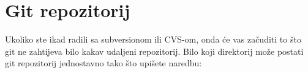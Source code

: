 \chapter*{Git repozitorij}

Ukoliko ste ikad radili sa subversionom ili CVS-om, onda će vas začuditi to što git ne zahtijeva bilo kakav udaljeni repozitorij. 
Bilo koji direktorij može postati git repozitorij jednostavno tako što upišete naredbu:


